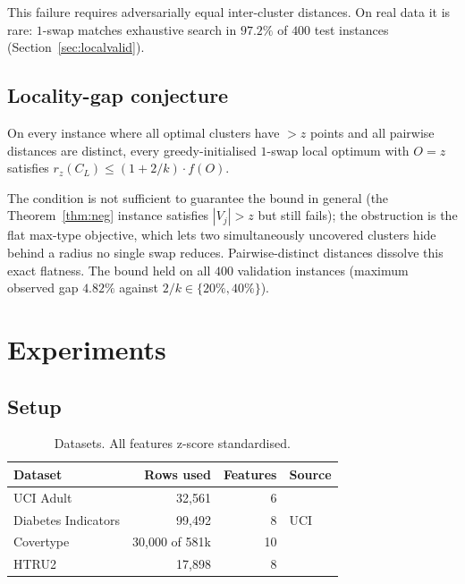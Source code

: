 \documentclass[twoside,leqno,twocolumn]{article}
\newcommand{\rz}{r_z}
\newcommand{\CL}{C_L}
\begin{document}
This failure requires adversarially equal inter-cluster distances.
On real data it is rare: $1$-swap matches exhaustive search in $97.2\%$
of $400$ test instances (Section~\ref{sec:localvalid}).

\subsection{Locality-gap conjecture}
\label{sec:conjecture}

\begin{conjecture}
On every instance where all optimal clusters have $>z$ points and all
pairwise distances are distinct, every greedy-initialised $1$-swap
local optimum with $O=z$ satisfies
$\rz(\CL)\le(1+2/k)\cdot f(O)$.
\end{conjecture}

The condition is not sufficient to guarantee the bound in general
(the Theorem~\ref{thm:neg} instance satisfies $|V_j|>z$ but still
fails); the obstruction is the flat max-type objective, which lets
two simultaneously uncovered clusters hide behind a radius no single
swap reduces. Pairwise-distinct distances dissolve this exact
flatness. The bound held on all $400$ validation instances
(maximum observed gap $4.82\%$ against $2/k\in\{20\%,40\%\}$).


\section{Experiments}
\label{sec:experiments}

\subsection{Setup}
\label{sec:expsetup}

\begin{table}[t]
\caption{Datasets. All features z-score standardised.}
\label{tab:datasets}
\centering
\begin{tabular}{lrrl}
\toprule
Dataset & Rows used & Features & Source \\
\midrule
UCI Adult            & 32{,}561         & 6  & \cite{adult_dataset} \\
Diabetes Indicators  & 99{,}492         & 8  & UCI \\
Covertype            & 30{,}000 of 581k & 10 & \cite{covertype_dataset} \\
HTRU2                & 17{,}898         & 8  & \cite{htru2} \\
\bottomrule
\end{tabular}
\end{table}
\end{document}
